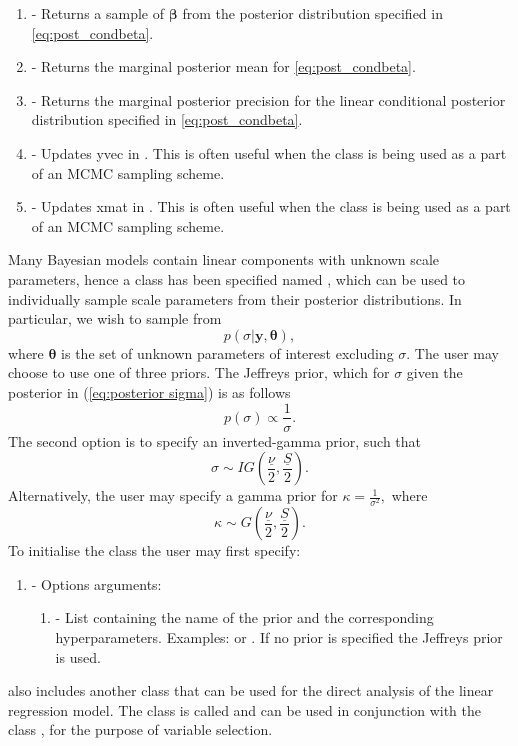 \documentclass[article]{jss}
\begin{document}
\begin{enumerate}

\item {} - Returns a sample of $\bm{\beta}$ from the
  posterior distribution specified in \ref{eq:post_condbeta}.
\item {} - Returns the marginal
  posterior mean for \ref{eq:post_condbeta}.
\item {} - Returns the
  marginal posterior precision for the linear conditional posterior
  distribution specified in \ref{eq:post_condbeta}.
\item {} - Updates yvec in
  . This is often useful when the class is
  being used as a part of an MCMC sampling scheme.
\item {} - Updates xmat in
  . This is often useful when the class is
  being used as a part of an MCMC sampling scheme.
\end{enumerate}
Many Bayesian models contain linear components with unknown scale
parameters, hence a class has been specified named
, which can be used to individually sample
scale parameters from their posterior distributions. In particular, we
wish to sample from
\begin{equation} p(\sigma|\bm{y},\bm{\theta}),\label{eq:posterior
    sigma}
\end{equation} where $\bm{\theta}$ is the set of unknown
parameters of interest excluding $\sigma.$ The user may choose to use
one of three priors.  The Jeffreys prior, which for $\sigma$ given
the posterior in (\ref{eq:posterior sigma}) is as follows \[
p(\sigma)\propto\frac{1}{\sigma}.\] The second option is to specify an
inverted-gamma prior, such that\[ \sigma\sim
IG\left(\frac{\underline{\nu}}{2},\frac{\underline{S}}{2}\right).\]
Alternatively, the user may specify a gamma prior for
$\kappa=\frac{1}{\sigma^{2}},$ where\[ \kappa\sim
G\left(\frac{\underline{\nu}}{2},\frac{\underline{S}}{2}\right).\] To
initialise the class  the user may first
specify:
\begin{enumerate}
\item {} - Options arguments:
\begin{enumerate}
\item {} - List containing the name of the prior and the
  corresponding hyperparameters. Examples:
   or
  . If no prior is
  specified the Jeffreys prior is used.
\end{enumerate}
\end{enumerate}
 also includes another class that can be used for the
direct analysis of the linear regression model. The class is called
 and can be used in conjunction with the class
, for the purpose of variable selection.
\end{document}
